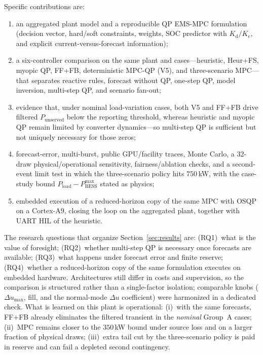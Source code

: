 \documentclass{ieeeaccess}
\begin{document}
Specific contributions are:
\begin{enumerate}
\item an aggregated plant model and a reproducible QP EMS-MPC formulation (decision vector, hard/soft constraints, weights, SOC predictor with $K_{\mathrm{d}}/K_{\mathrm{c}}$, and explicit current-versus-forecast information);
\item a six-controller comparison on the same plant and cases---heuristic, Heur+FS, myopic QP, FF+FB, deterministic MPC-QP (V5), and three-scenario MPC---that separates reactive rules, forecast without QP, one-step QP, model inversion, multi-step QP, and scenario fan-out;
\item evidence that, under nominal load-variation cases, both V5 and FF+FB drive filtered $P_{\mathrm{unserved}}$ below the reporting threshold, whereas heuristic and myopic QP remain limited by converter dynamics---so multi-step QP is sufficient but not uniquely necessary for those zeros;
\item forecast-error, multi-burst, public GPU/facility traces, Monte Carlo, a 32-draw physical/operational sensitivity, fairness/ablation checks, and a second-event limit test in which the three-scenario policy hits $750$\,kW, with the case-study bound $P_{\mathrm{load}}-P_{\mathrm{BESS}}^{\max}$ stated as physics;
\item embedded execution of a reduced-horizon copy of the same MPC with OSQP on a Cortex-A9, closing the loop on the aggregated plant, together with UART HIL of the heuristic.
\end{enumerate}

The research questions that organize Section~\ref{sec:results} are: (RQ1)~what is the value of foresight; (RQ2)~whether multi-step QP is necessary once forecasts are available; (RQ3)~what happens under forecast error and finite reserve; (RQ4)~whether a reduced-horizon copy of the same formulation executes on embedded hardware. Architectures still differ in costs and supervision, so the comparison is structured rather than a single-factor isolation; comparable knobs ($\Delta u_{\max}$, fill, and the normal-mode $\Delta u$ coefficient) were harmonized in a dedicated check. What is learned on this plant is operational: (i)~with the same forecasts, FF+FB already eliminates the filtered transient in the \emph{nominal} Group~A cases; (ii)~MPC remains closer to the $350$\,kW bound under source loss and on a larger fraction of physical draws; (iii)~extra tail cut by the three-scenario policy is paid in reserve and can fail a depleted second contingency.
\end{document}
